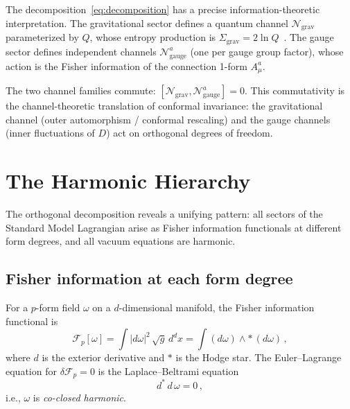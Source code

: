 \documentclass[prd,twocolumn,superscriptaddress,longbibliography]{revtex4-2}
\newcommand{\chan}{\mathcal{N}}
\newcommand{\Sgrav}{\Sigma_{\mathrm{grav}}}
\begin{document}
The decomposition~\eqref{eq:decomposition} has a precise
information-theoretic interpretation.
The gravitational sector defines a quantum channel
$\chan_{\mathrm{grav}}$ parameterized by $Q$, whose
entropy production is $\Sgrav = 2\ln Q$~\cite{PaperII}.
The gauge sector defines independent channels
$\chan_{\mathrm{gauge}}^a$ (one per gauge group factor),
whose action is the Fisher information of the connection
1-form $A_\mu^a$.

The two channel families commute:
$[\chan_{\mathrm{grav}},\chan_{\mathrm{gauge}}^a]=0$.
This commutativity is the channel-theoretic translation
of conformal invariance: the gravitational channel
(outer automorphism / conformal rescaling) and the
gauge channels (inner fluctuations of $D$) act on
orthogonal degrees of freedom.


\section{The Harmonic Hierarchy}
\label{sec:harmonic}

The orthogonal decomposition reveals a unifying pattern:
all sectors of the Standard Model Lagrangian arise as
Fisher information functionals at different form degrees,
and all vacuum equations are harmonic.

\subsection{Fisher information at each form degree}

For a $p$-form field $\omega$ on a $d$-dimensional manifold,
the Fisher information functional is~\cite{Frieden2004}
\begin{equation}\label{eq:Fisher_p}
  \mathcal{F}_p[\omega]
  = \int |d\omega|^2\,\sqrt{g}\,d^dx
  = \int (d\omega) \wedge *\,(d\omega)\,,
\end{equation}
where $d$ is the exterior derivative and $*$ is the Hodge star.
The Euler--Lagrange equation for
$\delta\mathcal{F}_p = 0$ is the Laplace--Beltrami equation
\begin{equation}\label{eq:harmonic}
  d^*\,d\,\omega = 0\,,
\end{equation}
i.e., $\omega$ is \emph{co-closed harmonic}.
\end{document}
